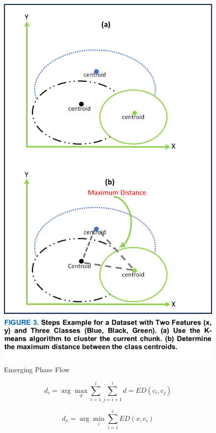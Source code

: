 \begin{figure}[!ht]
	\centering
	\includegraphics[width=1\linewidth]{5_Emerging/figures/scenario2.png}
	\caption{Emerging Phase Flow}
	\label{fig:5_scenario2}
\end{figure}

\begin{equation}
	\label{eq:5_first_proposal_1}
    d_c = \arg\max_d \sum_{i=1}^{i} \sum_{j=i+1}^{i} d = ED(c_i, c_j)
\end{equation}

\begin{equation}
	\label{eq:5_first_proposal_2}
	d_x = \arg\min_i \sum_{i=1}^{i} ED(x, c_i)
\end{equation}

